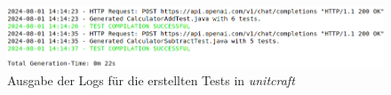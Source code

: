 \begin{figure}[h]
    \centering
    \includegraphics[width=1\textwidth]{Assets/Images/tests.png}
    \caption{Ausgabe der Logs für die erstellten Tests in \textit{unitcraft}}
    \label{fig:tests}
\end{figure}